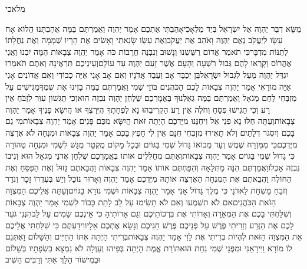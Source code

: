 \documentclass[../main/main.tex]{subfiles}
\begin{document}
\thispagestyle{empty}
\Incipit{}מלאכי
\cleardoublepage
\RTLmulticolcolumns
\begin{multicols*}{\ncols}
מַשָּׂא דְבַר יַהְוֶה אֶל יִשְׂרָאֵל בְּיַד מַלְאָכִי\PreVerseSpace{}אָהַבְתִּי אֶתְכֶם אָמַר יַהְוֶה וַאֲמַרְתֶּם בַּמָּה אֲהַבְתָּנוּ הֲלוֹא אָח עֵשָׂו לְיַעֲקֹב נְאֻם יַהְוֶה וָאֹהַב אֶת יַעֲקֹב\PreVerseSpace{}וְאֶת עֵשָׂו שָׂנֵאתִי וָאָשִׂים אֶת הָרָיו שְׁמָמָה וְאֶת נַחֲלָתוֹ לְתַנּוֹת מִדְבָּר\PreVerseSpace{}כִּי תֹאמַר אֱדוֹם רֻשַּׁשְׁנוּ וְנָשׁוּב וְנִבְנֶה חֳרָבוֹת כֹּה אָמַר יַהְוֶה צְבָאוֹת הֵמָּה יִבְנוּ וַאֲנִי אֶהֱרוֹס וְקָרְאוּ לָהֶם גְּבוּל רִשְׁעָה וְהָעָם אֲשֶׁר זָעַם יַהְוֶה עַד עוֹלָם\PreVerseSpace{}וְעֵינֵיכֶם תִּרְאֶינָה וְאַתֶּם תֹּאמְרוּ יִגְדַּל יַהְוֶה מֵעַל לִגְבוּל יִשְׂרָאֵל\PreVerseSpace{}בֵּן יְכַבֵּד אָב וְעֶבֶד אֲדֹנָיו וְאִם אָב אָנִי אַיֵּה כְבוֹדִי וְאִם אֲדוֹנִים אָנִי אַיֵּה מוֹרָאִי אָמַר יַהְוֶה צְבָאוֹת לָכֶם הַכֹּהֲנִים בּוֹזֵי שְׁמִי וַאֲמַרְתֶּם בַּמֶּה בָזִינוּ אֶת שְׁמֶךָ\PreVerseSpace{}מַגִּישִׁים עַל מִזְבְּחִי לֶחֶם מְגֹאָל וַאֲמַרְתֶּם בַּמֶּה גֵאַלְנוּךָ בֶּאֱמָרְכֶם שֻׁלְחַן יַהְוֶה נִבְזֶה הוּא\PreVerseSpace{}וְכִי תַגִּשׁוּן עִוֵּר לִזְבֹּחַ אֵין רָע וְכִי תַגִּישׁוּ פִּסֵּחַ וְחֹלֶה אֵין רָע הַקְרִיבֵהוּ נָא לְפֶחָתֶךָ הֲיִּרְצְךָ אוֹ הֲיִשָּׂא פָנֶיךָ אָמַר יַהְוֶה צְבָאוֹת\PreVerseSpace{}וְעַתָּה חַלּוּ נָא פְנֵי אֵל וִיחֵנֵּנוּ מִיֶּדְכֶם הָיְתָה זֹּאת הֲיִשָּׂא מִכֶּם פָּנִים אָמַר יַהְוֶה צְבָאוֹת\PreVerseSpace{}מִי גַם בָּכֶם וְיִסְגֹּר דְּלָתַיִם וְלֹא תָאִירוּ מִזְבְּחִי חִנָּם אֵין לִי חֵפֶץ בָּכֶם אָמַר יַהְוֶה צְבָאוֹת וּמִנְחָה לֹא אֶרְצֶה מִיֶּדְכֶם\PreVerseSpace{}כִּי מִמִּזְרַח שֶׁמֶשׁ וְעַד מְבוֹאוֹ גָּדוֹל שְׁמִי בַּגּוֹיִם וּבְכָל מָקוֹם מֻקְטָר מֻגָּשׁ לִשְׁמִי וּמִנְחָה טְהוֹרָה כִּי גָדוֹל שְׁמִי בַּגּוֹיִם אָמַר יַהְוֶה צְבָאוֹת\PreVerseSpace{}וְאַתֶּם מְחַלְּלִים אוֹתוֹ בֶּאֱמָרְכֶם שֻׁלְחַן אֲדֹנַי מְגֹאָל הוּא וְנִיבוֹ נִבְזֶה אָכְלוֹ\PreVerseSpace{}וַאֲמַרְתֶּם הִנֵּה מַתְּלָאָה וְהִפַּחְתֶּם אוֹתוֹ אָמַר יַהְוֶה צְבָאוֹת וַהֲבֵאתֶם גָּזוּל וְאֶת הַפִּסֵּחַ וְאֶת הַחוֹלֶה וַהֲבֵאתֶם אֶת הַמִּנְחָה הַאֶרְצֶה אוֹתָהּ מִיֶּדְכֶם אָמַר יַהְוֶה \ClosedSection{}וְאָרוּר נוֹכֵל וְיֵשׁ בְּעֶדְרוֹ זָכָר וְנֹדֵר וְזֹבֵחַ מָשְׁחָת לַאדֹנָי כִּי מֶלֶךְ גָּדוֹל אָנִי אָמַר יַהְוֶה צְבָאוֹת וּשְׁמִי נוֹרָא בַגּוֹיִם\PreChapterSpace{}וְעַתָּה אֲלֵיכֶם הַמִּצְוָה הַזֹּאת הַכֹּהֲנִים\PreVerseSpace{}אִם לֹא תִשְׁמְעוּ וְאִם לֹא תָשִׂימוּ עַל לֵב לָתֵת כָּבוֹד לִשְׁמִי אָמַר יַהְוֶה צְבָאוֹת וְשִׁלַּחְתִּי בָכֶם אֶת הַמְּאֵרָה וְאָרוֹתִי אֶת בִּרְכוֹתֵיכֶם וְגַם אָרוֹתִיהָ כִּי אֵינְכֶם שָׂמִים עַל לֵב\PreVerseSpace{}הִנְנִי גֹעֵר לָכֶם אֶת הַזֶּרַע וְזֵרִיתִי פֶרֶשׁ עַל פְּנֵיכֶם פֶּרֶשׁ חַגֵּיכֶם וְנָשָׂא אֶתְכֶם אֵלָיו\PreVerseSpace{}וִידַעְתֶּם כִּי שִׁלַּחְתִּי אֲלֵיכֶם אֵת הַמִּצְוָה הַזֹּאת לִהְיוֹת בְּרִיתִי אֶת לֵוִי אָמַר יַהְוֶה צְבָאוֹת\PreVerseSpace{}בְּרִיתִי הָיְתָה אִתּוֹ הַחַיִּים וְהַשָּׁלוֹם וָאֶתְּנֵם לוֹ מוֹרָא וַיִּירָאֵנִי וּמִפְּנֵי שְׁמִי נִחַת הוּא\PreVerseSpace{}תּוֹרַת אֱמֶת הָיְתָה בְּפִיהוּ וְעַוְלָה לֹא נִמְצָא בִשְׂפָתָיו בְּשָׁלוֹם וּבְמִישׁוֹר הָלַךְ אִתִּי וְרַבִּים הֵשִׁיב 
\end{multicols*}
\end{document}
